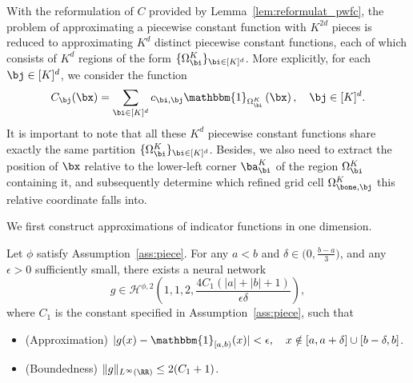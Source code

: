 \documentclass[11pt]{article}
\begin{document}
With the reformulation of $C$ provided by Lemma~\ref{lem:reformulat_pwfc}, the problem of approximating a piecewise constant function with $K^{2d}$ pieces is reduced to approximating $K^d$ distinct piecewise constant functions, each of which consists of $K^d$ regions of the form $\{\Omega_{\bi}^K\}_{\bi \in [K]^d}$. More explicitly, for each $\bj \in [K]^d$, we consider the function
\begin{equation}
    C_{\bj}(\bx) = \sum_{\bi \in [K]^d} c_{\bi, \bj} \mathbbm{1}_{\Omega_{\bi}^K} \left( \bx \right), \quad \bj \in [K]^d.
    \label{eq:pwcf-coarse}
\end{equation}
It is important to note that all these $K^d$ piecewise constant functions share exactly the same partition $\{\Omega_{\bi}^K\}_{\bi \in [K]^d}$. 
Besides, we also need to extract the position of $\bx$ relative to the lower-left corner $\ba_{\bi}^K$ of the region $\Omega_{\bi}^K$ containing it, and subsequently determine which refined grid cell ${\Omega_{\bone, \bj}^{ K}}$ this relative coordinate falls into.


We first construct approximations of
indicator functions in one dimension.
\begin{lemma}
    Let $\phi$ satisfy Assumption~\ref{ass:piece}.
    For any $a<b$ and $\delta\in\bigl(0,\tfrac{b-a}{3}\bigr)$, and any $\epsilon >0$ sufficiently small, there exists a neural network
    \begin{equation*}
        g \in \mathcal{H}^{\phi,2} \left(1, 1, 2,   \frac{4C_1 (|a| + |b|+1)}{\epsilon \delta} \right),
    \end{equation*}
    where $C_1$ is the constant specified in Assumption~\ref{ass:piece}, such that 
    \begin{itemize}
        \item (Approximation) $|g(x) - \mathbbm{1}_{[a,b)} (x)| < \epsilon, \quad x \notin [a, a+ \delta] \cup [b-\delta, b]$.
        \item (Boundedness) $\|g\|_{L^{\infty}(\RR)} \leq 2 (C_1 + 1)$.
    \end{itemize}
    \label{lem:1D_indicator_app_Heaviside}
\end{lemma}
\end{document}
